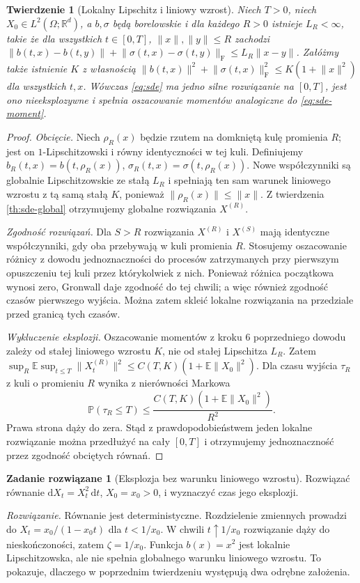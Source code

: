 \documentclass[11pt,a4paper,oneside]{report}
\numberwithin{equation}{chapter}
\theoremstyle{plain}
\newtheorem{twierdzenie}{Twierdzenie}[chapter]
\theoremstyle{definition}
\newtheorem{zadanie}{Zadanie rozwiązane}[chapter]
\theoremstyle{remark}
\newcommand{\R}{\mathbb{R}}
\newcommand{\Prob}{\mathbb{P}}
\newcommand{\E}{\mathbb{E}}
\newcommand{\dd}{\mathrm{d}}
\newcommand{\norm}[1]{\lVert #1\rVert}
\begin{document}
\begin{twierdzenie}[Lokalny Lipschitz i liniowy wzrost]\label{thm:volIII:05:03}
\label{th:sde-local}
Niech $T>0$, niech $X_0\in L^2(\Omega;\R^d)$,
a $b,\sigma$ będą borelowskie i dla każdego $R>0$
istnieje $L_R<\infty$, takie że dla wszystkich
$t\in[0,T]$, $\norm x,\norm y\le R$ zachodzi
$\norm{b(t,x)-b(t,y)}+\norm{\sigma(t,x)-\sigma(t,y)}_{\mathrm F}
\le L_R\norm{x-y}$.
Załóżmy także istnienie $K$ z własnością
$\norm{b(t,x)}^2+\norm{\sigma(t,x)}_{\mathrm F}^2
\le K(1+\norm{x}^2)$ dla wszystkich $t,x$.
Wówczas \eqref{eq:sde} ma jedno silne rozwiązanie
na $[0,T]$, jest ono nieeksplozywne i spełnia
oszacowanie momentów analogiczne do \eqref{eq:sde-moment}.
\end{twierdzenie}
\begin{proof}
\emph{Obcięcie.} Niech $\rho_R(x)$ będzie rzutem
na domkniętą kulę promienia $R$; jest on $1$-Lipschitzowski
i równy identyczności w tej kuli. Definiujemy
$b_R(t,x)=b(t,\rho_R(x))$,
$\sigma_R(t,x)=\sigma(t,\rho_R(x))$.
Nowe współczynniki są globalnie Lipschitzowskie
ze stałą $L_R$ i spełniają ten sam warunek liniowego
wzrostu z tą samą stałą $K$, ponieważ
$\norm{\rho_R(x)}\le\norm x$.
Z twierdzenia \ref{th:sde-global} otrzymujemy
globalne rozwiązania $X^{(R)}$.

\emph{Zgodność rozwiązań.} Dla $S>R$ rozwiązania
$X^{(R)}$ i $X^{(S)}$ mają identyczne współczynniki,
gdy oba przebywają w kuli promienia $R$.
Stosujemy oszacowanie różnicy z dowodu jednoznaczności
do procesów zatrzymanych przy pierwszym opuszczeniu tej kuli
przez którykolwiek z nich. Ponieważ różnica początkowa
wynosi zero, Gronwall daje zgodność do tej chwili;
a więc również zgodność czasów pierwszego wyjścia.
Można zatem skleić lokalne rozwiązania na przedziale
przed granicą tych czasów.

\emph{Wykluczenie eksplozji.} Oszacowanie momentów z
kroku 6 poprzedniego dowodu zależy od stałej liniowego
wzrostu $K$, nie od stałej Lipschitza $L_R$.
Zatem $\sup_R\E\sup_{t\le T}\norm{X_t^{(R)}}^2
\le C(T,K)(1+\E\norm{X_0}^2)$.
Dla czasu wyjścia $\tau_R$ z kuli o promieniu $R$
wynika z nierówności Markowa
\[
\Prob(\tau_R\le T)\le
\frac{C(T,K)(1+\E\norm{X_0}^2)}{R^2}.
\]
Prawa strona dąży do zera. Stąd z prawdopodobieństwem
jeden lokalne rozwiązanie można przedłużyć na cały
$[0,T]$ i otrzymujemy jednoznaczność przez zgodność
obciętych równań.
\end{proof}

\begin{zadanie}[Eksplozja bez warunku liniowego wzrostu]
Rozwiązać równanie $\dd X_t=X_t^2\,\dd t$,
$X_0=x_0>0$, i wyznaczyć czas jego eksplozji.

\emph{Rozwiązanie.} Równanie jest deterministyczne.
Rozdzielenie zmiennych prowadzi do
$X_t=x_0/(1-x_0t)$ dla $t<1/x_0$.
W chwili $t\uparrow1/x_0$ rozwiązanie dąży do
nieskończoności, zatem $\zeta=1/x_0$. Funkcja
$b(x)=x^2$ jest lokalnie Lipschitzowska, ale nie
spełnia globalnego warunku liniowego wzrostu.
To pokazuje, dlaczego w poprzednim twierdzeniu
występują dwa odrębne założenia.
\end{zadanie}
\end{document}
